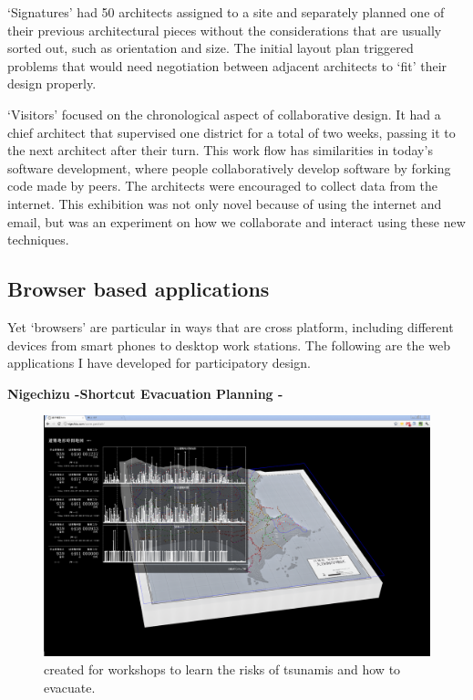 `Signatures' had 50 architects assigned to a site and separately planned one of their previous architectural pieces without the considerations that are usually sorted out, such as orientation and size. The initial layout plan triggered problems that would need negotiation between adjacent architects to `fit' their design properly. 

`Visitors' focused on the chronological aspect of collaborative design. It had a chief architect that supervised one district for a total of two weeks, passing it to the next architect after their turn. This work flow has similarities in today’s software development, where people collaboratively develop software by forking code made by peers. The architects were encouraged to collect data from the internet. This exhibition was not only novel because of using the internet and email, but was an experiment on how we collaborate and interact using these new techniques.



\subsection{Browser based applications}

 Yet ‘browsers’ are particular in ways that are cross platform, including different devices from smart phones to desktop work stations. The following are the web applications I have developed for participatory design.

\textbf{Nigechizu -Shortcut Evacuation Planning -}

\begin{figure}[htb]
  \includegraphics[width=\textwidth]{chapters/3/fig/nigechizu002.png}               
  \caption[nigechizu]{ created for workshops
to learn the risks of tsunamis and how to evacuate.}
  \label{fig:nigechizu}
\end{figure}

